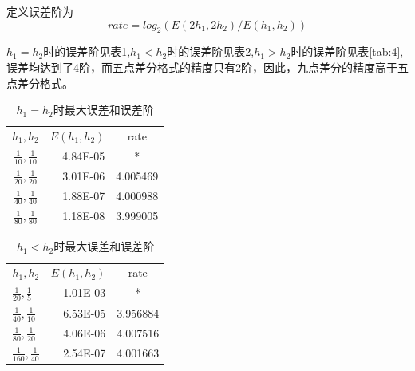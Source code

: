 \documentclass[withoutpreface,bwprint]{cumcmthesis} %
\begin{document}
	定义误差阶为
	$$rate=log_{2}(E(2h_{1},2h_{2})/E(h_{1},h_{2}))$$
	
	
	$h_{1} =h_{2}$时的误差阶见表\ref{tab:2},$h_{1} < h_{2}$时的误差阶见表\ref{tab:3},$h_{1} >h_{2}$时的误差阶见表\ref{tab:4},误差均达到了4阶，而五点差分格式的精度只有2阶，因此，九点差分的精度高于五点差分格式。
	\begin{table}[htbp]
		\centering
		\caption{$h_{1}=h_{2}$时最大误差和误差阶}
		\begin{tabular}{crr}
			\toprule[1.5pt]
			\multirow{2}[0]{*}{$h_{1},h_{2}$} & \multicolumn{1}{c}{\multirow{2}[0]{*}{$E(h_{1},h_{2})$}} & \multicolumn{1}{c}{\multirow{2}[0]{*}{rate}} \\
			&       &  \\
			\midrule[1pt]
			$\frac{1}{10},\frac{1}{10}$ & 4.84E-05 & \multicolumn{1}{c}{*} \\
			$\frac{1}{20},\frac{1}{20}$ & 3.01E-06 & 4.005469 \\
			$\frac{1}{40},\frac{1}{40}$ & 1.88E-07 & 4.000988 \\
			$\frac{1}{80},\frac{1}{80}$ & 1.18E-08 & 3.999005 \\
			\bottomrule[1.5pt]
		\end{tabular}%
		\label{tab:2}%
	\end{table}%

	\begin{table}[htbp]
		\centering
		\caption{$h_{1}<h_{2}$时最大误差和误差阶}
		\begin{tabular}{lrc}
			\toprule[1.5pt]
			\multicolumn{1}{c}{\multirow{2}[0]{*}{$h_{1},h_{2}$}} & \multicolumn{1}{c}{\multirow{2}[0]{*}{$E(h_{1},h_{2})$}} & \multirow{2}[0]{*}{rate} \\
			&       &  \\
			\midrule[1pt]
			$\frac{1}{20},\frac{1}{5}$ & 1.01E-03 & * \\
			$\frac{1}{40},\frac{1}{10}$ & 6.53E-05 & 3.956884  \\
			$\frac{1}{80},\frac{1}{20}$ & 4.06E-06 & 4.007516  \\
			$\frac{1}{160},\frac{1}{40}$ & 2.54E-07 & 4.001663  \\
			\bottomrule[1.5pt]
		\end{tabular}%
		\label{tab:3}%
	\end{table}%
	
\end{document}
